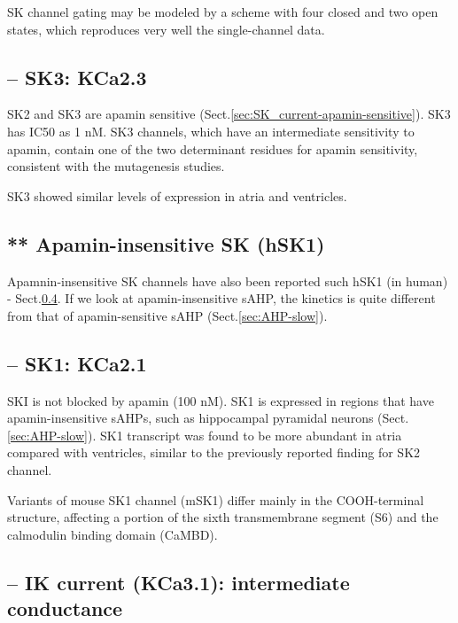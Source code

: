 SK channel gating may be modeled by a scheme with four closed and two open
states, which reproduces very well the single-channel data.

\subsection{-- SK3: KCa2.3}
\label{sec:SK_current-2.3}

SK2 and SK3 are apamin sensitive (Sect.\ref{sec:SK_current-apamin-sensitive}).
SK3 has IC50 as 1 nM.
SK3 channels, which have an intermediate sensitivity to apamin, contain one of
the two determinant residues for apamin sensitivity, consistent with the
mutagenesis studies.

SK3 showed similar levels of expression in atria and ventricles.





\subsection{** Apamin-insensitive SK (hSK1)}
\label{sec:SK_current-apamin-insensitive}

Apamnin-insensitive SK channels have also been reported such hSK1 (in human) -
Sect.\ref{sec:IK_current}. If we look at apamin-insensitive sAHP, the kinetics
is quite different from that of apamin-sensitive sAHP (Sect.\ref{sec:AHP-slow}).


\subsection{-- SK1: KCa2.1}
\label{sec:SK_current-2.1}

SKI is not blocked by apamin (100 nM).
SK1 is expressed in regions that have apamin-insensitive sAHPs, such as
hippocampal pyramidal neurons (Sect.\ref{sec:AHP-slow}).
SK1 transcript was found to be more abundant in atria compared with ventricles,
similar to the previously reported finding for SK2 channel.

Variants of mouse SK1 channel (mSK1) differ mainly in the COOH-terminal
structure, affecting a portion of the sixth transmembrane segment (S6) and the
calmodulin binding domain (CaMBD).


\subsection{-- IK current (KCa3.1): intermediate conductance}
\label{sec:IK_current}

